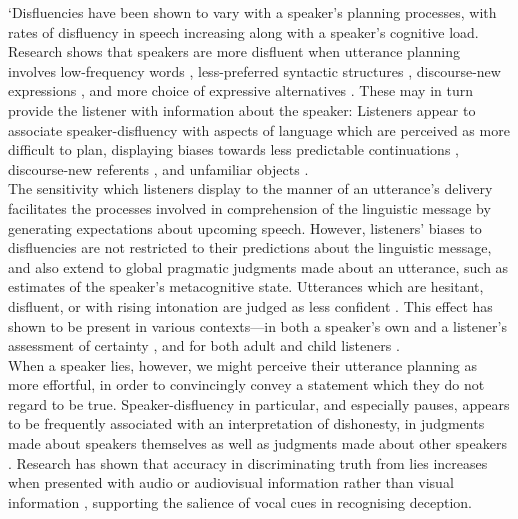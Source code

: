 \documentclass[a4paper,man,natbib]{apa6}
\begin{document}
`Disfluencies have been shown to vary with a speaker's planning processes, with rates of disfluency in speech increasing along with a speaker's cognitive load\citep{Bortfeld2001}. Research shows that speakers are more disfluent when utterance planning involves low-frequency words \citep{Beattie1979}, less-preferred syntactic structures \citep{Cook2009}, discourse-new expressions \citep{Arnold2003}, and more choice of expressive alternatives \citep{Schachter1991}. 
These may in turn provide the listener with information about the speaker: Listeners appear to associate speaker-disfluency with aspects of language which are perceived as more difficult to plan, displaying biases towards less predictable continuations \citep{Corley2007}, discourse-new referents \citep{Barr2001, Arnold2004}, and unfamiliar objects \citep{Arnold2007}.\\

The sensitivity which listeners display to the manner of an utterance's delivery facilitates the processes involved in comprehension of the linguistic message by generating expectations about upcoming speech. 
However, listeners' biases to disfluencies are not restricted to their predictions about the linguistic message, and also extend to global pragmatic judgments made about an utterance, such as estimates of the speaker's metacognitive state.
Utterances which are hesitant, disfluent, or with rising intonation are judged as less confident \citep{Smith1993, Brennan1995}.
This effect has shown to be present in various contexts---in both a speaker's own and a listener's assessment of certainty \citep{Swerts2005}, and for both adult and child listeners \citep{Krahmer2005}. \\

When a speaker lies, however, we might perceive their utterance planning as more effortful, in order to convincingly convey a statement which they do not regard to be true.
Speaker-disfluency in particular, and especially pauses, appears to be frequently associated with an interpretation of dishonesty, in judgments made about speakers themselves as well as judgments made about other speakers \citep{Zuckerman1981}.
Research has shown that accuracy in discriminating truth from lies increases when presented with audio or audiovisual information rather than visual information \citep{Bond2006}, supporting the salience of vocal cues in recognising deception.\\
\end{document}
